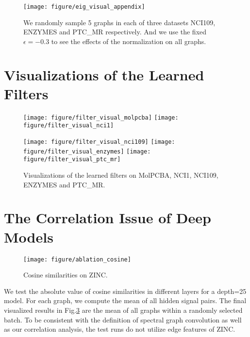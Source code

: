\documentclass[nohyperref]{article}
\theoremstyle{plain}
\theoremstyle{definition}
\theoremstyle{remark}
\begin{document}
\begin{figure}[h]
	\centering
	\texttt{[image: figure/eig\_visual\_appendix]}
	\vspace{-10pt}
	\caption{We randomly sample 5 graphs in each of three datasets NCI109, ENZYMES and PTC\_MR respectively. And we use the fixed $\epsilon=-0.3$ to see the effects of the normalization on all graphs.}
	\label{fig:spectrum_visualizations}
\end{figure}

\FloatBarrier
\section{Visualizations of the Learned Filters}
\label{filter_visualizations}

\begin{figure}[h]
	\centering
	\texttt{[image: figure/filter\_visual\_molpcba]}
	\texttt{[image: figure/filter\_visual\_nci1]}
\end{figure}
\begin{figure}[h]
	\texttt{[image: figure/filter\_visual\_nci109]}
	\texttt{[image: figure/filter\_visual\_enzymes]}
	\texttt{[image: figure/filter\_visual\_ptc\_mr]}
	\caption{Visualizations of the learned filters on MolPCBA, NCI1, NCI109, ENZYMES and PTC\_MR.}
	\label{fig:filter_visualizations1}
\end{figure}

\FloatBarrier
\section{The Correlation Issue of Deep Models}
\label{ablate_deep}

\begin{figure}[ht]
	\centering
	\texttt{[image: figure/ablation\_cosine]}
	\vspace{-10pt}
	\caption{Cosine similarities on ZINC.}
	\label{fig:zinc_cosine}
\end{figure}
We test the absolute value of cosine similarities in different layers for a depth=25 model. For each graph, we compute the mean of all hidden signal pairs. The final visualized results in Fig.\ref{fig:zinc_cosine} are the mean of all graphs within a randomly selected batch. To be consistent with the definition of spectral graph convolution as well as our correlation analysis, the test runs do not utilize edge features of ZINC.
\end{document}
